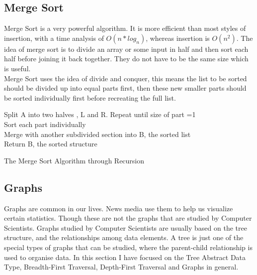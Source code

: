 \documentclass[10pt,twocolumn]{IEEEtran}
\begin{document}
\subsection{Merge Sort}
Merge Sort is a very powerful algorithm. It is more efficient than most styles of insertion, with a time analysis of $O(n * log_{n})$, whereas insertion is $O(n^2)$. The idea of merge sort is to divide an array or some input in half and then sort each half before joining it back together. They do not have to be the same size which is useful.  \\
Merge Sort uses the idea of divide and conquer, this means the list to be sorted should be divided up into equal parts first, then these new smaller parts should be sorted individually first before recreating the full list.
\IncMargin{1em}
\begin{algorithm}
	\SetAlgoLined
  	{Split A into two halves , L and R. Repeat until size of part =1\\
  	Sort each part individually \\
  	Merge with another subdivided section into B, the sorted list\\ 
  	Return B, the sorted structure}
\caption{The Merge Sort Algorithm through Recursion}
\end{algorithm}\DecMargin{1em}

	\subsection{Graphs}
	Graphs are common in our lives. News media use them to help us visualize certain statistics. Though these are not the graphs that are studied by Computer Scientists. Graphs studied by Computer Scientists are usually based on the tree structure, and the relationships 	among data elements. A tree is just one of the special types of graphs that can be studied, where the parent-child relationship is used to organise data. In this section I have focused on the Tree Abstract Data Type, Breadth-First Traversal, Depth-First Traversal and Graphs in general. \\
\end{document}
